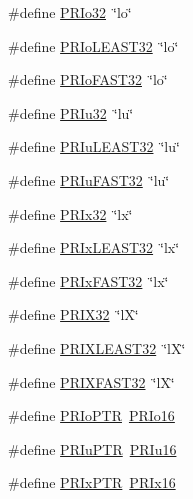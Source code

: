 \begin{DoxyCompactItemize}
\item 
\#define \hyperlink{group__avr__inttypes_ga7276f64276fd7223ca6f4cca0444239a}{P\+R\+Io32}~\char`\"{}lo\char`\"{}
\item 
\#define \hyperlink{group__avr__inttypes_ga1e5c50a1ca71da7ff8c4f3f007411be8}{P\+R\+Io\+L\+E\+A\+S\+T32}~\char`\"{}lo\char`\"{}
\item 
\#define \hyperlink{group__avr__inttypes_ga6ac7e3111d008785ddf3b29dcd088732}{P\+R\+Io\+F\+A\+S\+T32}~\char`\"{}lo\char`\"{}
\item 
\#define \hyperlink{group__avr__inttypes_gaaf2af4a10f0bd308e9c349c8382382be}{P\+R\+Iu32}~\char`\"{}lu\char`\"{}
\item 
\#define \hyperlink{group__avr__inttypes_gaab353a2898377162c1829f1a9708352e}{P\+R\+Iu\+L\+E\+A\+S\+T32}~\char`\"{}lu\char`\"{}
\item 
\#define \hyperlink{group__avr__inttypes_gaccc383115328197264988682edfcb72c}{P\+R\+Iu\+F\+A\+S\+T32}~\char`\"{}lu\char`\"{}
\item 
\#define \hyperlink{group__avr__inttypes_ga80ca66bcc9e366733f02c90ed4b0838c}{P\+R\+Ix32}~\char`\"{}lx\char`\"{}
\item 
\#define \hyperlink{group__avr__inttypes_ga1d766603a3524c9e03effbbece9c2118}{P\+R\+Ix\+L\+E\+A\+S\+T32}~\char`\"{}lx\char`\"{}
\item 
\#define \hyperlink{group__avr__inttypes_ga22caa684d44725e1e6e638983380f68e}{P\+R\+Ix\+F\+A\+S\+T32}~\char`\"{}lx\char`\"{}
\item 
\#define \hyperlink{group__avr__inttypes_ga32b0c8a04aae5d4454d15e6cbe109f64}{P\+R\+I\+X32}~\char`\"{}lX\char`\"{}
\item 
\#define \hyperlink{group__avr__inttypes_gaaf100a10f9cd73d46294fd0e8db5246d}{P\+R\+I\+X\+L\+E\+A\+S\+T32}~\char`\"{}lX\char`\"{}
\item 
\#define \hyperlink{group__avr__inttypes_gace7057a6fa96ac7e2a05946ee96cf2d9}{P\+R\+I\+X\+F\+A\+S\+T32}~\char`\"{}lX\char`\"{}
\item 
\#define \hyperlink{group__avr__inttypes_ga1468793ce960b477922ef92b36a6c802}{P\+R\+Io\+P\+TR}~\hyperlink{group__avr__inttypes_ga55494a16151668ea78e0b808ef38c8c1}{P\+R\+Io16}
\item 
\#define \hyperlink{group__avr__inttypes_gaa1ca3a85113e897b5cf7ed6b92d74de2}{P\+R\+Iu\+P\+TR}~\hyperlink{group__avr__inttypes_ga86bc00ee87e8e40787e0681fc34c576a}{P\+R\+Iu16}
\item 
\#define \hyperlink{group__avr__inttypes_ga9c3c25e6145e629e4c9fabddc6061c30}{P\+R\+Ix\+P\+TR}~\hyperlink{group__avr__inttypes_ga70f5e38b517f714518c970a4da37bef1}{P\+R\+Ix16}

\end{DoxyCompactItemize}
